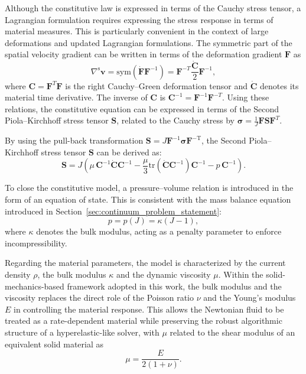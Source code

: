 \documentclass[11pt,english]{article}
\begin{document}
    \noindent Although the constitutive law is expressed in terms of the Cauchy stress tensor, a Lagrangian formulation requires expressing the stress response in terms of material measures. This is particularly convenient in the context of large deformations and updated Lagrangian formulations. The symmetric part of the spatial velocity gradient can be written in terms of the deformation gradient $\mathbf{F}$ as
    \begin{equation*}
    \nabla^{\mathrm{s}}\boldsymbol{v} = \mathrm{sym}(\dot{\mathbf{F}}\mathbf{F}^{-1}) = \mathbf{F}^{-T} \frac{\dot{\mathbf{C}}}{2} \mathbf{F}^{-1},
    \end{equation*}
    where $\mathbf{C} = \mathbf{F}^{T}\mathbf{F}$ is the right Cauchy--Green deformation tensor and $\dot{\mathbf{C}}$ denotes its material time derivative. The inverse of $\mathbf{C}$ is $\mathbf{C}^{-1} = \mathbf{F}^{-1}\mathbf{F}^{-T}$. Using these relations, the constitutive equation can be expressed in terms of the Second Piola--Kirchhoff stress tensor $\mathbf{S}$, related to the Cauchy stress by
    $ \boldsymbol{\sigma} = \frac{1}{J}\mathbf{F}\mathbf{S}\mathbf{F}^{T}.$
    
    By using the pull-back transformation $\mathbf{S} = J\mathbf{F}^{-1}\boldsymbol{\sigma}\mathbf{F}^{-\mathrm{T}}$, the Second Piola--Kirchhoff stress tensor $\mathbf{S}$ can be derived as:
    \begin{equation}
    \mathbf{S} = J\left(\mu\,\mathbf{C}^{-1}\dot{\mathbf{C}}\mathbf{C}^{-1} - \frac{\mu}{3}\mathrm{tr}(\dot{\mathbf{C}}\mathbf{C}^{-1})\mathbf{C}^{-1} - p\,\mathbf{C}^{-1} \right). \label{eq:second-piola-kirchhoff}
    \end{equation}
    
    \noindent To close the constitutive model, a pressure--volume relation is introduced in the form of an equation of state. This is consistent with the mass balance equation introduced in Section~\ref{sec:continuum_problem_statement}:
    \begin{equation}
    p = p(J) = \kappa \left(J - 1\right), \label{eq:press-volume}
    \end{equation}
    where $\kappa$ denotes the bulk modulus, acting as a penalty parameter to enforce incompressibility.
    
    \noindent Regarding the material parameters, the model is characterized by the current density $\rho$, the bulk modulus $\kappa$ and the dynamic viscosity $\mu$. Within the solid-mechanics-based framework adopted in this work, the bulk modulus and the viscosity replaces the direct role of the Poisson ratio $\nu$ and the Young's modulus $E$ in controlling the material response. 
    This allows the Newtonian fluid to be treated as a rate-dependent material while preserving the robust algorithmic structure of a hyperelastic-like solver, with $\mu$ related to the shear modulus of an equivalent solid material as
    \begin{equation*}
        \mu = \frac{E}{2(1+\nu)}.
    \end{equation*}
\end{document}
